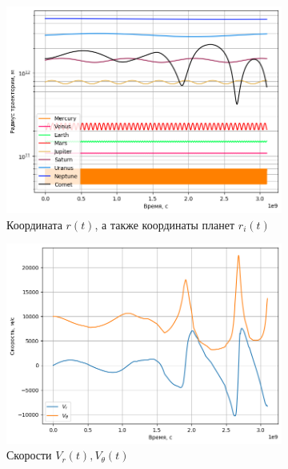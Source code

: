 \begin{figure}[H]
    \centering
    \begin{subfigure}{0.49\linewidth}
        \centering
		\includegraphics[width=1\linewidth]{imgs_8/r.png}
		\caption{Координата $r(t)$, а также координаты планет $r_i(t)$}
	\end{subfigure}
	\begin{subfigure}{0.49\linewidth}
        \centering
		\includegraphics[width=1\linewidth]{imgs_8/v.png}
		\caption{Скорости $V_r(t), V_\theta(t)$}
	\end{subfigure}
	\begin{subfigure}{0.49\linewidth}
        \centering

\end{subfigure}
\end{figure}

